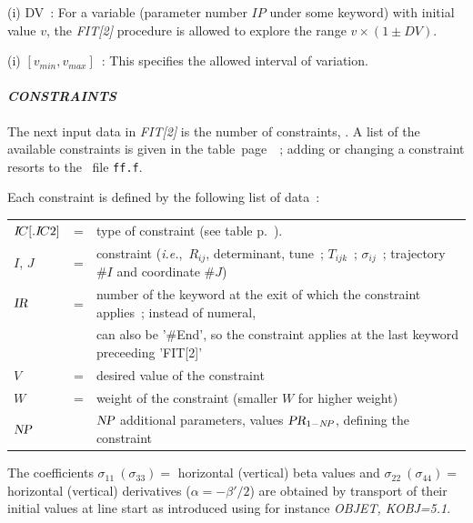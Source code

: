 \noindent (i) DV~: For a variable (parameter number $ IP $ under some keyword) 
 with initial value $ v $, the \textsl{FIT[2]} procedure is
allowed to explore the range $ v\times(1\pm DV)$.   

\smallskip

\noindent (i) $[v_{min}, v_{max}]$~: This specifies the allowed interval of variation. 


\paragraph{\textsl{CONSTRAINTS}}  

\noindent The next input data in \textsl{FIT[2]} is the number of constraints, \textsl{\NC}. 
A list of the available constraints is given in the table~page~\pageref{TabFITZlst1}~; adding or changing a constraint 
resorts to the \FORTRAN\ file \texttt{ff.f}. 

\medskip 

Each constraint is defined by the following list of data~: 

\begin{center}
	\begin{tabular}{lcp{15cm}}
	$I\!C[.I\!C 2]$        &  = &  type of  constraint (see table p.~\pageref{TabFITZlst1}).\\
	$I$, $J$    & =  &  constraint (\emph{i.e.},~$R_{ij}$, determinant, tune~; 
	                    $T_{ijk}$~; $\sigma_{ ij}$~; trajectory $\#I$ and coordinate $\#J$)\\
	\label{RefIR}
        $\textsl{IR}$       &  =  &  number of the keyword at the exit of which the constraint applies~;  instead of numeral, \\[-.3ex]
                    &     & can also be '\#End', so the constraint applies at the last keyword preceeding 'FIT[2]' \\
	$V$        &  =  &  desired value of the constraint\\
	$W$        &  =  &  weight of the constraint (smaller $W$ for higher weight)  \\
        $\textsl{NP}$       &    &   $\textsl{NP}$ additional parameters, values $\textsl{PR}_{1 - N\!P}$, defining the constraint  
	\end{tabular}
\end{center}



 The coefficients 
$ \sigma_{11}~(\sigma_{ 33}) = $ horizontal (vertical) beta values and 
$ \sigma_{ 22}~(\sigma_{ 44}) = $ horizontal (vertical) derivatives ($\alpha = -\beta'/2$) 
are obtained by transport of their initial values at line start as introduced using for instance  
\textsl{OBJET, KOBJ=5.1}.

